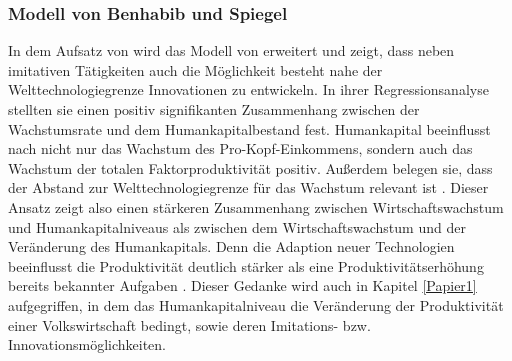 \subsubsection*{Modell von Benhabib und Spiegel}
In dem Aufsatz von \cite{Benhabib.1994} wird das Modell von \cite{Nelson.1966} erweitert und zeigt, dass neben imitativen Tätigkeiten auch die Möglichkeit besteht nahe der Welttechnologiegrenze Innovationen zu entwickeln. In ihrer Regressionsanalyse stellten sie einen positiv signifikanten Zusammenhang zwischen der Wachstumsrate und dem Humankapitalbestand fest. Humankapital beeinflusst nach \cite{Benhabib.1994} nicht nur das Wachstum des Pro-Kopf-Einkommens, sondern auch das Wachstum der totalen Faktorproduktivität positiv.  Außerdem belegen sie, dass der Abstand zur Welttechnologiegrenze für das Wachstum relevant ist \cite{Benhabib.1994}. Dieser Ansatz zeigt also einen stärkeren Zusammenhang zwischen Wirtschaftswachstum und Humankapitalniveaus als zwischen dem Wirtschaftswachstum und der Veränderung des Humankapitals. Denn die Adaption neuer Technologien beeinflusst die Produktivität deutlich stärker als eine Produktivitätserhöhung bereits bekannter Aufgaben \cite{Benhabib.1994}. Dieser Gedanke wird auch in Kapitel \ref{Papier1} aufgegriffen, in dem das Humankapitalniveau die Veränderung der Produktivität einer Volkswirtschaft bedingt, sowie deren Imitations- bzw. Innovationsmöglichkeiten. 
%

